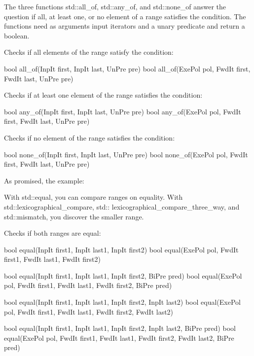 
The three functions std::all\_of, std::any\_of, and std::none\_of answer the question if all, at least one, or no element of a range satisfies the condition. The functions need as arguments input iterators and a unary predicate and return a boolean.

Checks if all elements of the range satisfy the condition:

\begin{cpp}
bool all_of(InpIt first, InpIt last, UnPre pre)
bool all_of(ExePol pol, FwdIt first, FwdIt last, UnPre pre)
\end{cpp}

Checks if at least one element of the range satisfies the condition:

\begin{cpp}
bool any_of(InpIt first, InpIt last, UnPre pre)
bool any_of(ExePol pol, FwdIt first, FwdIt last, UnPre pre)
\end{cpp}

Checks if no element of the range satisfies the condition:

\begin{cpp}
bool none_of(InpIt first, InpIt last, UnPre pre)
bool none_of(ExePol pol, FwdIt first, FwdIt last, UnPre pre)
\end{cpp}

As promised, the example:




With std::equal, you can compare ranges on equality. With std::lexicographical\_compare, std:: lexicographical\_compare\_three\_way, and std::mismatch, you discover the smaller range.

Checks if both ranges are equal:

\begin{cpp}
bool equal(InpIt first1, InpIt last1, InpIt first2)
bool equal(ExePol pol, FwdIt first1, FwdIt last1, FwdIt first2)

bool equal(InpIt first1, InpIt last1, InpIt first2, BiPre pred)
bool equal(ExePol pol, FwdIt first1, FwdIt last1, FwdIt first2, BiPre pred)

bool equal(InpIt first1, InpIt last1,
		   InpIt first2, InpIt last2)
bool equal(ExePol pol, FwdIt first1, FwdIt last1,
		   FwdIt first2, FwdIt last2)
		   
bool equal(InpIt first1, InpIt last1,
		   InpIt first2, InpIt last2, BiPre pred)
bool equal(ExePol pol, FwdIt first1, FwdIt last1,
		   FwdIt first2, FwdIt last2, BiPre pred)
\end{cpp}

